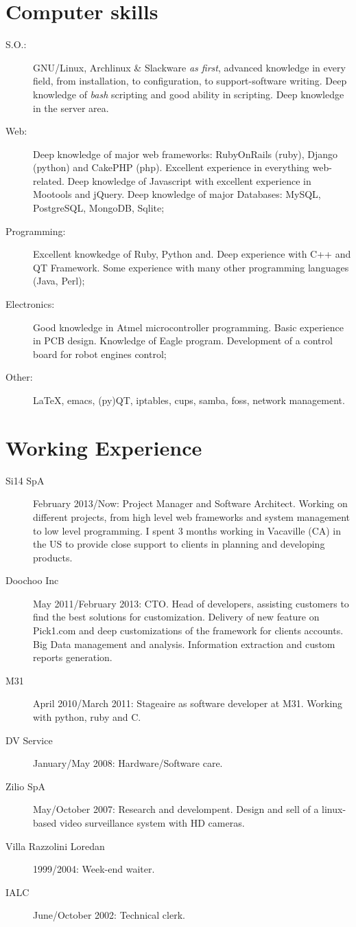 \documentclass[pdftex, a4paper, 11pt]{article}
\begin{document}
\section*{Computer skills}
\begin{description}
\item[S.O.:] GNU/Linux, Archlinux \& Slackware {\em as first}, advanced knowledge
  in every field, from installation, to configuration, to support-software
  writing. Deep knowledge of {\em bash} scripting and good ability in scripting.
  Deep knowledge in the server area.
\item[Web:] Deep knowledge of major web frameworks: RubyOnRails (ruby),
  Django (python) and CakePHP (php).
  Excellent experience in everything web-related.
  Deep knowledge of Javascript with excellent experience in Mootools and jQuery.
  Deep knowledge of major Databases: MySQL, PostgreSQL, MongoDB, Sqlite;
\item[Programming:] Excellent knowkedge of Ruby, Python and. Deep experience with C++ and QT Framework. Some experience with many other programming
  languages (Java, Perl);
\item[Electronics:] Good knowledge in Atmel microcontroller programming. Basic experience
  in PCB design. Knowledge of Eagle program. Development of a control board for robot
  engines control;
\item[Other:] \LaTeX, emacs, (py)QT, iptables, cups, samba, foss, network management.
\end{description}

\section*{Working Experience}
\begin{description}
\item[Si14 SpA] February 2013/Now: Project Manager and Software Architect.
    Working on different projects, from high level web frameworks and system management
    to low level programming. I spent 3 months working in Vacaville (CA) in the US
    to provide close support to clients in planning and developing products.
\item[Doochoo Inc] May 2011/February 2013: CTO. Head of developers, assisting
  customers to find the best solutions for customization.
  Delivery of new feature on Pick1.com and deep customizations of the framework
  for clients accounts. Big Data management and analysis. Information extraction and
  custom reports generation.
\item[M31] April 2010/March 2011: Stageaire as software developer at M31. Working with python, ruby and C.
\item[DV Service] January/May 2008: Hardware/Software care.
\item[Zilio SpA] May/October 2007: Research and develompent. Design and
  sell of a linux-based video surveillance system with HD cameras.
\item[Villa Razzolini Loredan] 1999/2004: Week-end waiter.
\item[IALC] June/October 2002: Technical clerk.
\end{description}
\end{document}
